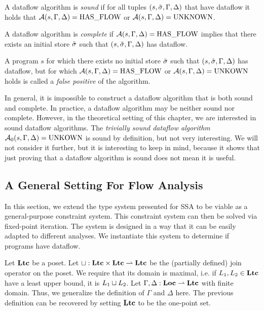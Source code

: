 \begin{definition}[Soundness]
    A dataflow algorithm is \emph{sound} if for all tuples $(s, \tilde{\sigma}, \Gamma, \Delta)$ that
    have dataflow it holds that $\operatorname{\mathcal{A}}(s, \Gamma, \Delta) = \text{HAS\_FLOW}$ or
    $\operatorname{\mathcal{A}}(s, \Gamma, \Delta) = \text{UNKNOWN}$.
\end{definition}

\begin{definition}[Completeness]
    A dataflow algorithm is \emph{complete} if $\operatorname{\mathcal{A}}(s, \Gamma, \Delta) = \text{HAS\_FLOW}$
    implies that there exists an initial store $\tilde{\sigma}$
     such that $(s, \tilde{\sigma}, \Gamma, \Delta)$ has dataflow.
\end{definition}
\begin{definition}
    A program $s$ for which there exists no initial store $\tilde{\sigma}$ such that 
    $(s, \tilde{\sigma}, \Gamma, \Delta)$ has dataflow, but for which $\operatorname{\mathcal{A}}(s, \Gamma, \Delta) = \text{HAS\_FLOW}$
    or $\operatorname{\mathcal{A}}(s, \Gamma, \Delta) = \text{UNKOWN}$ holds
    is called a \emph{false positive} of the algorithm.
\end{definition}
\begin{remark}
    In general, it is impossible to construct a dataflow algorithm that is both 
    sound and complete.
    In practice, a dataflow algorithm may be neither sound nor complete.
    However, in the theoretical setting of this chapter, we are interested in 
    sound dataflow algorithms.
    The \emph{trivially sound dataflow algorithm} $\operatorname{\mathcal{A}}_0(s, \Gamma, \Delta) = \text{UNKOWN}$ 
    is sound by definition, but not very interesting.
    We will not consider it further, but it is interesting to keep in mind,
    because it shows that just proving that a dataflow algorithm is sound does not
    mean it is useful.    
\end{remark}

\subsection{A General Setting For Flow Analysis}
In this section, we extend the type system presented for SSA to be viable as a
general-purpose constraint system.
This constraint system can then be solved via fixed-point iteration.
The system is designed in a way that it can be easily adapted to different analyses.
We instantiate this system to determine if programs have dataflow.

Let $\textbf{Ltc}$ be a poset.
Let $\mathbin\sqcup: \textbf{Ltc} \times \textbf{Ltc} \rightharpoonup \textbf{Ltc}$ be the (partially defined)
join operator on the poset.
We require that its domain is maximal, i.e. if $L_1, L_2 \in \textbf{Ltc}$ have a least upper
bound, it is $L_1 \mathbin\sqcup L_2$.
Let $\Gamma, \Delta: \textbf{Loc} \rightharpoonup \textbf{Ltc}$ with finite domain.
Thus, we generalize the definition of $\Gamma$ and $\Delta$ here.
The previous definition can be recovered by setting $\textbf{Ltc}$ to be the one-point set.

